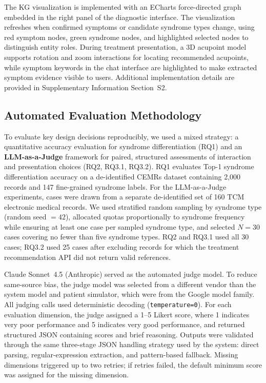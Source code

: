 The KG visualization is implemented with an ECharts force-directed graph embedded in the right panel of the diagnostic interface. The visualization refreshes when confirmed symptoms or candidate syndrome types change, using red symptom nodes, green syndrome nodes, and highlighted selected nodes to distinguish entity roles. During treatment presentation, a 3D acupoint model supports rotation and zoom interactions for locating recommended acupoints, while symptom keywords in the chat interface are highlighted to make extracted symptom evidence visible to users. Additional implementation details are provided in Supplementary Information Section~S2.

\subsection{Automated Evaluation Methodology}\label{sec:eval-methodology}

To evaluate key design decisions reproducibly, we used a mixed strategy: a quantitative accuracy evaluation for syndrome differentiation (RQ1) and an \textbf{LLM-as-a-Judge} framework for paired, structured assessments of interaction and presentation choices (RQ2, RQ3.1, RQ3.2). RQ1 evaluates Top-1 syndrome differentiation accuracy on a de-identified CEMRs dataset containing 2,000 records and 147 fine-grained syndrome labels. For the LLM-as-a-Judge experiments, cases were drawn from a separate de-identified set of 160 TCM electronic medical records. We used stratified random sampling by syndrome type (random seed $=42$), allocated quotas proportionally to syndrome frequency while ensuring at least one case per sampled syndrome type, and selected $N=30$ cases covering no fewer than five syndrome types. RQ2 and RQ3.1 used all 30 cases; RQ3.2 used 25 cases after excluding records for which the treatment recommendation API did not return valid references.

Claude Sonnet~4.5 (Anthropic) served as the automated judge model. To reduce same-source bias, the judge model was selected from a different vendor than the system model and patient simulator, which were from the Google model family. All judging calls used deterministic decoding (\texttt{temperature=0}). For each evaluation dimension, the judge assigned a 1--5 Likert score, where 1 indicates very poor performance and 5 indicates very good performance, and returned structured JSON containing scores and brief reasoning. Outputs were validated through the same three-stage JSON handling strategy used by the system: direct parsing, regular-expression extraction, and pattern-based fallback. Missing dimensions triggered up to two retries; if retries failed, the default minimum score was assigned for the missing dimension.

